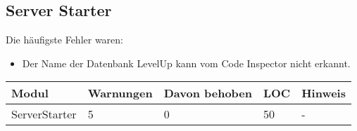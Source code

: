 \documentclass[qualitaetssicherung.tex]{subfiles}
\begin{document}
			
\subsection{Server Starter}
			Die häufigste Fehler waren:
			\begin{itemize}
				\item Der Name der Datenbank LevelUp kann vom Code Inspector nicht erkannt.
			\end{itemize}
			\begin{center}
					\begin{tabular}{| l | l | l | l | l |}
					\hline
					Modul & Warnungen & Davon behoben & LOC & Hinweis\\ \hline
					ServerStarter & 5 & 0 & 50 & - \\ \hline
					\hline
					\end{tabular}
			\end{center}
\end{document}
